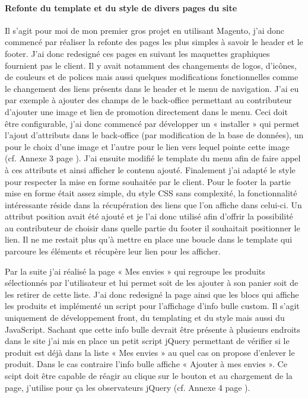 \documentclass[a4paper,11pt,twoside]{report}
\begin{document}
    	\paragraph*{Refonte du template et du style de divers pages du site}
	Il s'agit pour moi de mon premier gros projet en utilisant Magento, j'ai donc commencé par réaliser la refonte des pages les plus simples à savoir le header et le footer. J'ai donc redesigné ces pages en suivant les maquettes graphiques fournient pas le client. Il y avait notamment des changements de logos, d'icônes, de couleurs et de polices mais aussi quelques modifications fonctionnelles comme le changement des liens présents dans le header et le menu de navigation. J'ai eu par exemple à ajouter des champs de le back-office permettant au contributeur d'ajouter une image et lien de promotion directement dans le menu. Ceci doit être configurable, j'ai donc commencé par développer un « installer » qui permet l'ajout d'attributs dans le back-office (par modification de la base de données), un pour le choix d'une image et l'autre pour le lien vers lequel pointe cette image (cf. Annexe 3 page \pageref{annexe3}). J'ai ensuite modifié le template du menu afin de faire appel à ces attributs et ainsi afficher le contenu ajouté. Finalement j'ai adapté le style pour respecter la mise en forme souhaitée par le client. Pour le footer la partie mise en forme était assez simple, du style CSS sans complexité, la fonctionnalité intéressante réside dans la récupération des liens que l'on affiche dans celui-ci. Un attribut position avait été ajouté et je l'ai donc utilisé afin d'offrir la possibilité au contributeur de choisir dans quelle partie du footer il souhaitait positionner le lien. Il ne me restait plus qu'à mettre en place une boucle dans le template qui parcoure les éléments et récupère leur lien pour les afficher.
	
	Par la suite j'ai réalisé la page « Mes envies » qui regroupe les produits sélectionnés par l'utilisateur et lui permet soit de les ajouter à son panier soit de les retirer de cette liste. J'ai donc redesigné la page ainsi que les blocs qui affiche les produits et implémenté un script pour l'affichage d'info bulle custom. Il s'agit uniquement de développement front, du templating et du style mais aussi du JavaScript. Sachant que cette info bulle devrait être présente à plusieurs endroits dans le site j'ai mis en place un petit script jQuery permettant de vérifier si le produit est déjà dans la liste « Mes envies » au quel cas on propose d'enlever le produit. Dans le cas contraire l'info bulle affiche « Ajouter à mes envies ». Ce scipt doit être capable de réagir au clique sur le bouton et au chargement de la page, j'utilise pour ça les observateurs jQuery (cf. Annexe 4 page \pageref{annexe4}).
\end{document}
